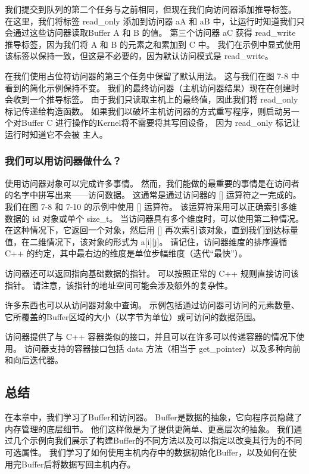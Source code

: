 我们提交到队列的第二个任务与之前相同，但现在我们向访问器添加推导标签。 
在这里，我们将标签 read\_only 添加到访问器 aA 和 aB 中，让运行时知道我们只会通过这些访问器读取Buffer A 和 B 的值。 
第三个访问器 aC 获得 read\_write 推导标签，因为我们将 A 和 B 的元素之和累加到 C 中。
我们在示例中显式使用该标签以保持一致，但这是不必要的，因为默认访问模式是 read\_write。

在我们使用占位符访问器的第三个任务中保留了默认用法。 这与我们在图 7-8 中看到的简化示例保持不变。 
我们的最终访问器（主机访问器结果）现在在创建时会收到一个推导标签。 
由于我们只读取主机上的最终值，因此我们将 read\_only 标记传递给构造函数。 
如果我们以破坏主机访问器的方式重写程序，则启动另一个对Buffer C 进行操作的Kernel将不需要将其写回设备，
因为 read\_only 标记让运行时知道它不会被 主人。

\subsubsection{我们可以用访问器做什么？}
使用访问器对象可以完成许多事情。 然而，我们能做的最重要的事情是在访问者的名字中拼写出来——访问数据。 
这通常是通过访问器的 [] 运算符之一完成的。 我们在图 7-8 和 7-10 的示例中使用 [] 运算符。 
该运算符采用可以正确索引多维数据的 id 对象或单个 size\_t。 当访问器具有多个维度时，可以使用第二种情况。 
在这种情况下，它返回一个对象，然后用 [] 再次索引该对象，直到我们到达标量值，在二维情况下，该对象的形式为 a[i][j]。 
请记住，访问器维度的排序遵循 C++ 的约定，其中最右边的维度是单位步幅维度（迭代“最快”）。

访问器还可以返回指向基础数据的指针。 可以按照正常的 C++ 规则直接访问该指针。 
请注意，该指针的地址空间可能会涉及额外的复杂性。

许多东西也可以从访问器对象中查询。 
示例包括通过访问器可访问的元素数量、它所覆盖的Buffer区域的大小（以字节为单位）或可访问的数据范围。

访问器提供了与 C++ 容器类似的接口，并且可以在许多可以传递容器的情况下使用。 
访问器支持的容器接口包括 data 方法（相当于 get\_pointer）以及多种向前和向后迭代器。

\subsection{总结}
在本章中，我们学习了Buffer和访问器。 Buffer是数据的抽象，它向程序员隐藏了内存管理的底层细节。 
他们这样做是为了提供更简单、更高层次的抽象。 
我们通过几个示例向我们展示了构建Buffer的不同方法以及可以指定以改变其行为的不同可选属性。 
我们学习了如何使用主机内存中的数据初始化Buffer，以及如何在使用完Buffer后将数据写回主机内存。

